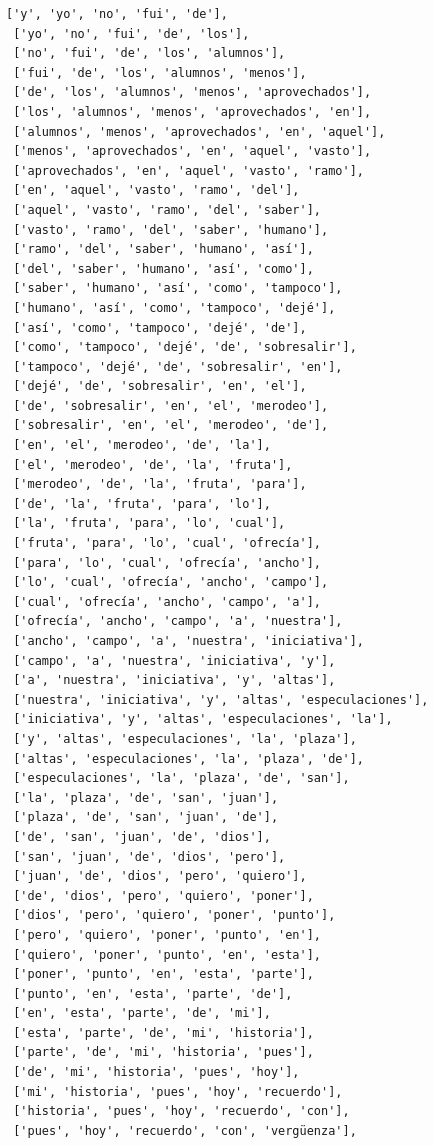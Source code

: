 \documentclass[11pt]{article}
\begin{document}
\begin{tcolorbox}[breakable, size=fbox, boxrule=1pt, pad at break*=1mm,colback=cellbackground, colframe=cellborder]
\begin{Verbatim}[commandchars=\\\{\}]
 ['y', 'yo', 'no', 'fui', 'de'],
 ['yo', 'no', 'fui', 'de', 'los'],
 ['no', 'fui', 'de', 'los', 'alumnos'],
 ['fui', 'de', 'los', 'alumnos', 'menos'],
 ['de', 'los', 'alumnos', 'menos', 'aprovechados'],
 ['los', 'alumnos', 'menos', 'aprovechados', 'en'],
 ['alumnos', 'menos', 'aprovechados', 'en', 'aquel'],
 ['menos', 'aprovechados', 'en', 'aquel', 'vasto'],
 ['aprovechados', 'en', 'aquel', 'vasto', 'ramo'],
 ['en', 'aquel', 'vasto', 'ramo', 'del'],
 ['aquel', 'vasto', 'ramo', 'del', 'saber'],
 ['vasto', 'ramo', 'del', 'saber', 'humano'],
 ['ramo', 'del', 'saber', 'humano', 'así'],
 ['del', 'saber', 'humano', 'así', 'como'],
 ['saber', 'humano', 'así', 'como', 'tampoco'],
 ['humano', 'así', 'como', 'tampoco', 'dejé'],
 ['así', 'como', 'tampoco', 'dejé', 'de'],
 ['como', 'tampoco', 'dejé', 'de', 'sobresalir'],
 ['tampoco', 'dejé', 'de', 'sobresalir', 'en'],
 ['dejé', 'de', 'sobresalir', 'en', 'el'],
 ['de', 'sobresalir', 'en', 'el', 'merodeo'],
 ['sobresalir', 'en', 'el', 'merodeo', 'de'],
 ['en', 'el', 'merodeo', 'de', 'la'],
 ['el', 'merodeo', 'de', 'la', 'fruta'],
 ['merodeo', 'de', 'la', 'fruta', 'para'],
 ['de', 'la', 'fruta', 'para', 'lo'],
 ['la', 'fruta', 'para', 'lo', 'cual'],
 ['fruta', 'para', 'lo', 'cual', 'ofrecía'],
 ['para', 'lo', 'cual', 'ofrecía', 'ancho'],
 ['lo', 'cual', 'ofrecía', 'ancho', 'campo'],
 ['cual', 'ofrecía', 'ancho', 'campo', 'a'],
 ['ofrecía', 'ancho', 'campo', 'a', 'nuestra'],
 ['ancho', 'campo', 'a', 'nuestra', 'iniciativa'],
 ['campo', 'a', 'nuestra', 'iniciativa', 'y'],
 ['a', 'nuestra', 'iniciativa', 'y', 'altas'],
 ['nuestra', 'iniciativa', 'y', 'altas', 'especulaciones'],
 ['iniciativa', 'y', 'altas', 'especulaciones', 'la'],
 ['y', 'altas', 'especulaciones', 'la', 'plaza'],
 ['altas', 'especulaciones', 'la', 'plaza', 'de'],
 ['especulaciones', 'la', 'plaza', 'de', 'san'],
 ['la', 'plaza', 'de', 'san', 'juan'],
 ['plaza', 'de', 'san', 'juan', 'de'],
 ['de', 'san', 'juan', 'de', 'dios'],
 ['san', 'juan', 'de', 'dios', 'pero'],
 ['juan', 'de', 'dios', 'pero', 'quiero'],
 ['de', 'dios', 'pero', 'quiero', 'poner'],
 ['dios', 'pero', 'quiero', 'poner', 'punto'],
 ['pero', 'quiero', 'poner', 'punto', 'en'],
 ['quiero', 'poner', 'punto', 'en', 'esta'],
 ['poner', 'punto', 'en', 'esta', 'parte'],
 ['punto', 'en', 'esta', 'parte', 'de'],
 ['en', 'esta', 'parte', 'de', 'mi'],
 ['esta', 'parte', 'de', 'mi', 'historia'],
 ['parte', 'de', 'mi', 'historia', 'pues'],
 ['de', 'mi', 'historia', 'pues', 'hoy'],
 ['mi', 'historia', 'pues', 'hoy', 'recuerdo'],
 ['historia', 'pues', 'hoy', 'recuerdo', 'con'],
 ['pues', 'hoy', 'recuerdo', 'con', 'vergüenza'],

\end{Verbatim}
\end{tcolorbox}
\end{document}
